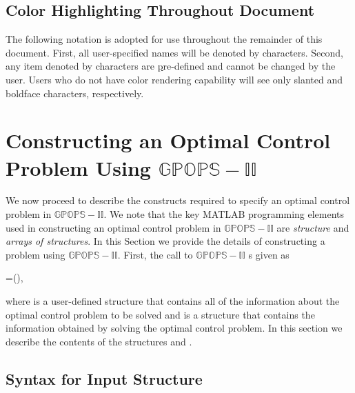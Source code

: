 \documentclass[10pt]{article}
\newcommand{\bfblue}[1]{\textrm{{\color{blue}{\bf #1}}}}
\newcommand{\slred}[1]{\textrm{\color{red}{\sl #1}}}
\begin{document}
\subsection{Color Highlighting Throughout Document}

The following notation is adopted for use throughout the remainder of
this document.  First, all user-specified names will be denoted by \slred{red
  slanted} characters.  Second, any item denoted by \bfblue{blue
  boldface} characters  are {\underline pre-defined} and cannot be changed by
the user.  Users who do not have color rendering capability will see
only slanted and boldface characters, respectively.  


\section{Constructing an Optimal Control Problem Using $\mathbb{GPOPS-II}$}

We now proceed to describe the constructs required to specify an
optimal control problem in $\mathbb{GPOPS-II}$.  We note that the key
MATLAB programming elements used in constructing an optimal control
problem in $\mathbb{GPOPS-II}$ are {\em structure} and {\em arrays of structures}.
In this Section we provide the details of constructing a problem using
$\mathbb{GPOPS-II}$.  First, the call to $\mathbb{GPOPS-II}$ s given as
\begin{center}
 \slred{output}=\bfblue{gpops2}(\slred{input}),
\end{center} 
where \slred{input} is a user-defined structure that contains all
of the information about the optimal control problem to be solved and
\slred{output} is a structure that contains the information obtained
by solving the optimal control problem.  In this section we describe
the contents of the structures \slred{input} and \slred{output}.  

\subsection{Syntax for Input Structure \bfblue{setup}  \label{sect:input-syntax}} 
\end{document}
